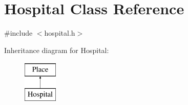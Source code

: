 \hypertarget{classHospital}{}\section{Hospital Class Reference}
\label{classHospital}


{\ttfamily \#include $<$hospital.\+h$>$}

Inheritance diagram for Hospital\+:\begin{figure}[H]
\begin{center}
\leavevmode
\includegraphics[height=2.000000cm]{classHospital}
\end{center}
\end{figure}
